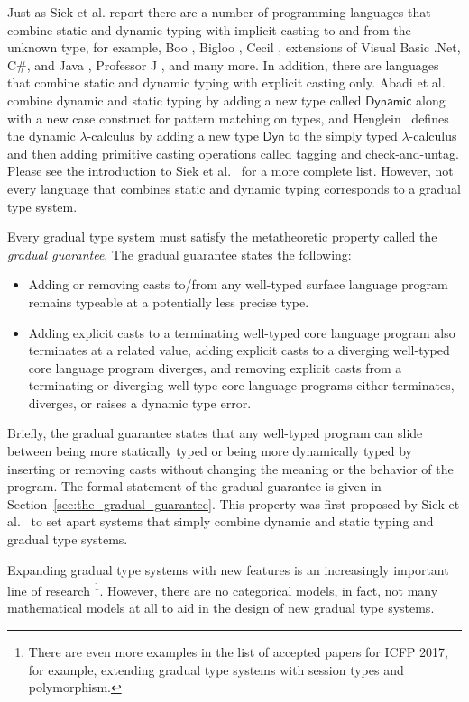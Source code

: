 Just as Siek et al. report \cite{Siek:2006,Siek:2007,Siek:2015} there
are a number of programming languages that combine static and dynamic
typing with implicit casting to and from the unknown type, for
example, Boo \cite{?}, Bigloo \cite{?,?}, Cecil \cite{?}, extensions
of Visual Basic .Net, C\#, and Java \cite{?,?}, Professor J \cite{?},
and many more.  In addition, there are languages that combine static
and dynamic typing with explicit casting only. Abadi et
al.~\cite{Abadi:1989} combine dynamic and static typing by adding a
new type called $\mathsf{Dynamic}$ along with a new case construct for
pattern matching on types, and Henglein~\cite{Henglein:1994} defines
the dynamic $\lambda$-calculus by adding a new type $\mathsf{Dyn}$ to
the simply typed $\lambda$-calculus and then adding primitive casting
operations called tagging and check-and-untag. Please see the
introduction to Siek et al.~\cite{Siek:2015} for a more complete
list. However, not every language that combines static and dynamic
typing corresponds to a gradual type system.

Every gradual type system must satisfy the metatheoretic property
called the \emph{gradual guarantee}.  The gradual guarantee states the
following:
\begin{itemize}
\item Adding or removing casts to/from any well-typed surface language
  program remains typeable at a potentially less precise type.
\item Adding explicit casts to a terminating well-typed core language
  program also terminates at a related value, adding explicit casts to
  a diverging well-typed core language program diverges, and removing
  explicit casts from a terminating or diverging well-type core
  language programs either terminates, diverges, or raises a dynamic
  type error.
\end{itemize}
Briefly, the gradual guarantee states that any well-typed program can
slide between being more statically typed or being more dynamically
typed by inserting or removing casts without changing the meaning or
the behavior of the program. The formal statement of the gradual
guarantee is given in Section~\ref{sec:the_gradual_guarantee}.  This
property was first proposed by Siek et al.~\cite{Siek:2015} to set
apart systems that simply combine dynamic and static typing and
gradual type systems.

Expanding gradual type systems with new features is an increasingly
important line of research \cite{Siek:2006,Siek:2007,Garcia:2016,
  Lehmann:2017:GRT:3009837.3009856,
  Jafery:2017:SUR:3093333.3009865}\footnote{There are even more
  examples in the list of accepted papers for ICFP 2017, for example,
  extending gradual type systems with session types and
  polymorphism.}.  However, there are no categorical models, in fact,
not many mathematical models at all to aid in the design of new
gradual type systems.

